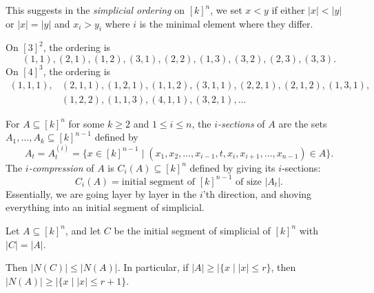 \documentclass[12pt]{article}
\begin{document}
This suggests in the \emph{simplicial ordering} on $[k]^{n}$, we set $x < y$ if either $|x| < |y|$ or $|x| = |y|$ and $x_i > y_i$ where $i$ is the minimal element where they differ.

\begin{exbox}
	On $[3]^2$, the ordering is
	\[
		(1,1), (2, 1), (1, 2), (3, 1), (2, 2), (1, 3), (3, 2), (2, 3), (3, 3).
	\]
	On $[4]^{3}$, the ordering is
	\begin{align*}
		(1, 1, 1), &(2, 1, 1), (1, 2, 1), (1, 1, 2), (3, 1, 1), (2, 2, 1), (2, 1, 2), (1, 3, 1), \\
			   &(1, 2, 2), (1, 1, 3), (4, 1, 1), (3, 2, 1), \ldots
	\end{align*}
\end{exbox}

For $A \subseteq [k]^{n}$ for some $k \geq 2$ and $1 \leq i \leq n$, the \emph{$i$-sections} of $A$ are the sets $A_1, \ldots, A_k \subseteq [k]^{n-1}$ defined by
\[
A_t = A_t^{(i)} = \{x \in [k]^{n-1} \mid (x_1, x_2, \ldots, x_{i-1}, t, x_i, x_{i+1}, \ldots, x_{n-1}) \in A \}.
\]
The \emph{$i$-compression} of $A$ is $C_i(A) \subseteq [k]^{n}$ defined by giving its $i$-sections:
\[
	C_i(A) = \text{initial segment of $[k]^{n-1}$ of size } |A_t|.
\]
Essentially, we are going layer by layer in the $i$'th direction, and shoving everything into an initial segment of simplicial.

\begin{theorem}
	Let $A \subseteq [k]^{n}$, and let $C$ be the initial segment of simplicial of $[k]^{n}$ with $|C| = |A|$. 

	Then $|N(C)| \leq |N(A)|$. In particular, if $|A| \geq |\{x \mid |x| \leq r\}$, then $|N(A)| \geq |\{x \mid |x| \leq r+1\}$.
\end{theorem}
\end{document}

